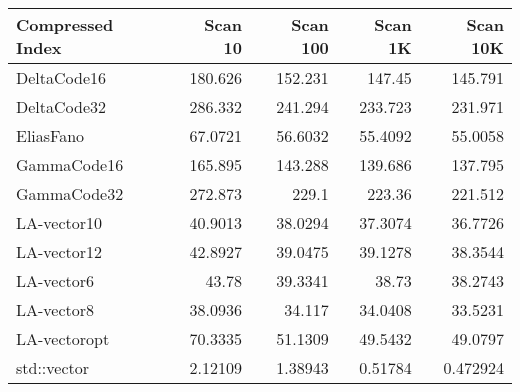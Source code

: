 \begin{tabular}{lrrrr}
\hline
 Compressed Index   &   Scan 10 &   Scan 100 &   Scan 1K &   Scan 10K \\
\hline
 DeltaCode16        & 180.626   &  152.231   & 147.45    & 145.791    \\
 DeltaCode32        & 286.332   &  241.294   & 233.723   & 231.971    \\
 EliasFano          &  67.0721  &   56.6032  &  55.4092  &  55.0058   \\
 GammaCode16        & 165.895   &  143.288   & 139.686   & 137.795    \\
 GammaCode32        & 272.873   &  229.1     & 223.36    & 221.512    \\
 LA-vector10        &  40.9013  &   38.0294  &  37.3074  &  36.7726   \\
 LA-vector12        &  42.8927  &   39.0475  &  39.1278  &  38.3544   \\
 LA-vector6         &  43.78    &   39.3341  &  38.73    &  38.2743   \\
 LA-vector8         &  38.0936  &   34.117   &  34.0408  &  33.5231   \\
 LA-vectoropt       &  70.3335  &   51.1309  &  49.5432  &  49.0797   \\
 std::vector        &   2.12109 &    1.38943 &   0.51784 &   0.472924 \\
\hline
\end{tabular}